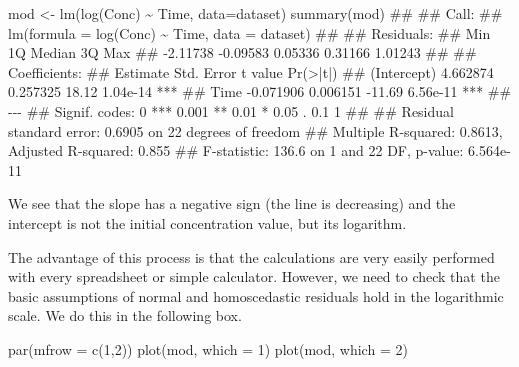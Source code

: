 \documentclass[a4paper,12pt,oneside]{book}
\newenvironment{Shaded}{\begin{snugshade}}{\end{snugshade}}
\newcommand{\DecValTok}[1]{#1}
\newcommand{\SpecialCharTok}[1]{#1}
\newcommand{\DocumentationTok}[1]{#1}
\newcommand{\OtherTok}[1]{#1}
\newcommand{\FunctionTok}[1]{#1}
\newcommand{\AttributeTok}[1]{#1}
\newcommand{\NormalTok}[1]{#1}
\begin{document}
\begin{Shaded}
\begin{Highlighting}[]
\NormalTok{mod }\OtherTok{\textless{}{-}} \FunctionTok{lm}\NormalTok{(}\FunctionTok{log}\NormalTok{(Conc) }\SpecialCharTok{\textasciitilde{}}\NormalTok{ Time, }\AttributeTok{data=}\NormalTok{dataset)}
\FunctionTok{summary}\NormalTok{(mod)}
\DocumentationTok{\#\# }
\DocumentationTok{\#\# Call:}
\DocumentationTok{\#\# lm(formula = log(Conc) \textasciitilde{} Time, data = dataset)}
\DocumentationTok{\#\# }
\DocumentationTok{\#\# Residuals:}
\DocumentationTok{\#\#      Min       1Q   Median       3Q      Max }
\DocumentationTok{\#\# {-}2.11738 {-}0.09583  0.05336  0.31166  1.01243 }
\DocumentationTok{\#\# }
\DocumentationTok{\#\# Coefficients:}
\DocumentationTok{\#\#              Estimate Std. Error t value Pr(\textgreater{}|t|)    }
\DocumentationTok{\#\# (Intercept)  4.662874   0.257325   18.12 1.04e{-}14 ***}
\DocumentationTok{\#\# Time        {-}0.071906   0.006151  {-}11.69 6.56e{-}11 ***}
\DocumentationTok{\#\# {-}{-}{-}}
\DocumentationTok{\#\# Signif. codes:  0 \textquotesingle{}***\textquotesingle{} 0.001 \textquotesingle{}**\textquotesingle{} 0.01 \textquotesingle{}*\textquotesingle{} 0.05 \textquotesingle{}.\textquotesingle{} 0.1 \textquotesingle{} \textquotesingle{} 1}
\DocumentationTok{\#\# }
\DocumentationTok{\#\# Residual standard error: 0.6905 on 22 degrees of freedom}
\DocumentationTok{\#\# Multiple R{-}squared:  0.8613, Adjusted R{-}squared:  0.855 }
\DocumentationTok{\#\# F{-}statistic: 136.6 on 1 and 22 DF,  p{-}value: 6.564e{-}11}
\end{Highlighting}
\end{Shaded}

We see that the slope has a negative sign (the line is decreasing) and the intercept is not the initial concentration value, but its logarithm.

The advantage of this process is that the calculations are very easily performed with every spreadsheet or simple calculator. However, we need to check that the basic assumptions of normal and homoscedastic residuals hold in the logarithmic scale. We do this in the following box.

\begin{Shaded}
\begin{Highlighting}[]
\FunctionTok{par}\NormalTok{(}\AttributeTok{mfrow =} \FunctionTok{c}\NormalTok{(}\DecValTok{1}\NormalTok{,}\DecValTok{2}\NormalTok{))}
\FunctionTok{plot}\NormalTok{(mod, }\AttributeTok{which =} \DecValTok{1}\NormalTok{)}
\FunctionTok{plot}\NormalTok{(mod, }\AttributeTok{which =} \DecValTok{2}\NormalTok{)}
\end{Highlighting}
\end{Shaded}
\end{document}
